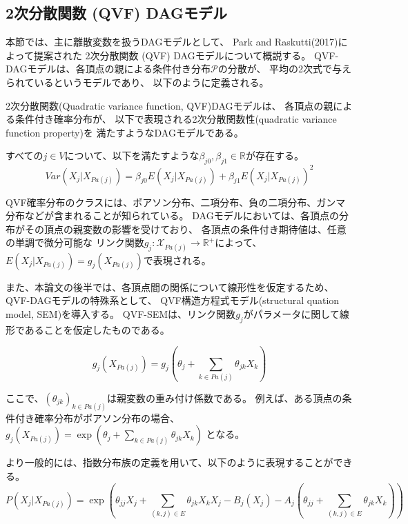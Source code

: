
\subsection{2次分散関数 (QVF) DAGモデル}

本節では、主に離散変数を扱うDAGモデルとして、
Park and Raskutti(2017)\cite{Park2017-hw}によって提案された
2次分散関数 (QVF) DAGモデルについて概説する。
QVF-DAGモデルは、各頂点の親による条件付き分布$\mathcal P$の分散が、
平均の2次式で与えられているというモデルであり、
以下のように定義される。

\begin{df}
2次分散関数(Quadratic variance function, QVF)DAGモデルは、
各頂点の親による条件付き確率分布が、
以下で表現される2次分散関数性(quadratic variance function property)を
満たすようなDAGモデルである。

すべての$j \in V$について、以下を満たすような$\beta_{j0}, \beta_{j1} \in \mathbb R$が存在する。
  \begin{equation}
      \mathit{Var}(X_j|X_{Pa(j)}) = \beta_{j0} E(X_j | X_{Pa(j)}) + \beta_{j1} E(X_j | X_{Pa(j)})^2
      \label{QVF}
  \end{equation}
\end{df}

QVF確率分布のクラスには、ポアソン分布、二項分布、負の二項分布、ガンマ分布などが含まれることが知られている。
DAGモデルにおいては、各頂点の分布がその頂点の親変数の影響を受けており、
各頂点の条件付き期待値は、任意の単調で微分可能な
リンク関数$g_j \colon \mathcal X_{Pa(j)} \rightarrow \mathbb R^+$によって、
$E(X_j|X_{Pa(j)}) = g_j(X_{Pa(j)})$で表現される。

また、本論文の後半では、各頂点間の関係について線形性を仮定するため、
QVF-DAGモデルの特殊系として、
QVF構造方程式モデル(structural quation model, SEM)を導入する。
QVF-SEMは、リンク関数$g_j$がパラメータに関して線形であることを仮定したものである。

\begin{equation}
  g_j(X_{Pa(j)}) = g_j \left(\theta_j + \sum_{k \in Pa(j)} \theta_{jk}X_k \right)
\end{equation}

ここで、$(\theta_{jk})_{k \in Pa(j)}$は親変数の重み付け係数である。
例えば、ある頂点の条件付き確率分布がポアソン分布の場合、
$g_j(X_{Pa(j)}) = \exp(\theta_j + \sum_{k \in Pa(j)} \theta_{jk}X_k)$
となる。

より一般的には、指数分布族の定義を用いて、以下のように表現することができる。
\begin{equation}
  P(X_j|X_{Pa(j)}) = \exp \left( \theta_{jj}X_j  + \sum_{(k,j)\in E} \theta_{jk}X_k X_j -
  B_j(X_j) - A_j \left( \theta_{jj} + \sum_{(k,j) \in E} \theta_{jk} X_k \right) \right)
\end{equation}

